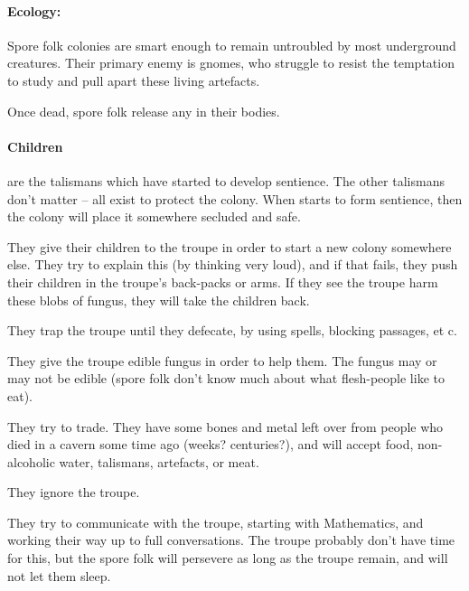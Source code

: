 \begin{multicols}{2}
\paragraph{Ecology:}
Spore folk colonies are smart enough to remain untroubled by most underground creatures.
Their primary enemy is gnomes, who struggle to resist the temptation to study and pull apart these living \glspl{artefact}.

Once dead, spore folk release any  in their bodies.

\paragraph{Children}
are the \glspl{talisman} which have started to develop sentience.
The other \glspl{talisman} don't matter -- all exist to protect the colony.
When  starts to form sentience, then the colony will place it somewhere secluded and safe.

\wotWosFungus

\showTalisman

\showEnc[plant]

\begin{dlist}
  \item
  They give their children to the troupe in order to start a new colony somewhere else.
  They try to explain this (by thinking very loud), and if that fails, they push their children in the troupe's back-packs or arms.
  If they see the troupe harm these blobs of fungus, they will take the children back.
  \item
  They trap the troupe until they defecate, by using spells, blocking passages, et c.
  \item
  They give the troupe edible fungus in order to help them.
  The fungus may or may not be edible (spore folk don't know much about what flesh-people like to eat).
  \item
  They try to trade.
  They have some bones and metal left over from people who died in a cavern some time ago (weeks? centuries?), and will accept food, non-alcoholic water, \glspl{talisman}, \glspl{artefact}, or meat.
  \item
  They ignore the troupe.
  \item
  They try to communicate with the troupe, starting with Mathematics, and working their way up to full conversations.
  The troupe probably don't have time for this, but the spore folk will persevere as long as the troupe remain, and will not let them sleep.
\end{dlist}


\end{multicols}
